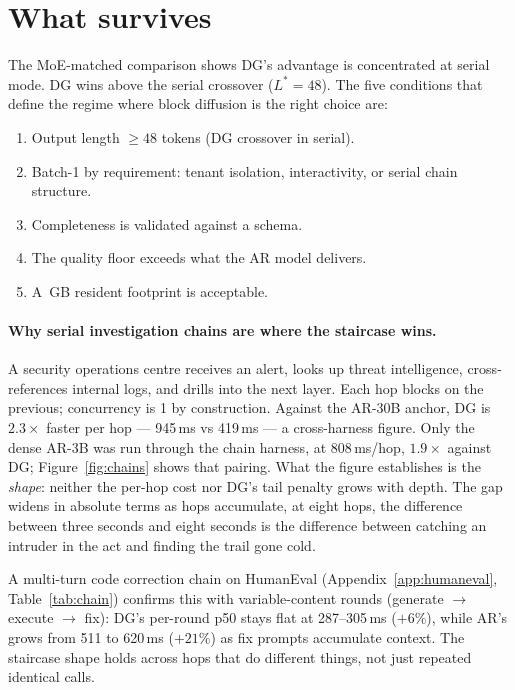 \section{What survives}
\label{sec:survives}

The MoE-matched comparison shows DG's advantage is concentrated at
serial mode. DG wins above the serial crossover ($L^{*}{=}48$). The
five conditions that define the regime where block diffusion is the
right choice are:
\begin{enumerate}[nosep]
  \item Output length $\geq 48$ tokens (DG crossover in serial).
  \item Batch-1 by requirement: tenant isolation, interactivity, or
    serial chain structure.
  \item Completeness is validated against a schema.
  \item The quality floor exceeds what the AR model delivers.
  \item A \dgWeights\,GB resident footprint is acceptable.
\end{enumerate}

\paragraph{Why serial investigation chains are where the staircase wins.}

A security operations centre receives an alert, looks up threat
intelligence, cross-references internal logs, and drills into the next
layer. Each hop blocks on the previous; concurrency is 1 by
construction. Against the AR-30B anchor, DG is $2.3\times$ faster per
hop --- 945\,ms vs 419\,ms --- a cross-harness figure. Only the dense
AR-3B was run through the chain harness, at 808\,ms/hop, $1.9\times$
against DG; Figure~\ref{fig:chains} shows that pairing. What the
figure establishes is the \emph{shape}: neither the per-hop cost nor
DG's tail penalty grows with depth. The gap widens in absolute terms
as hops accumulate, at eight hops, the difference between three
seconds and eight seconds is the difference between catching an
intruder in the act and finding the trail gone cold.

A multi-turn code correction chain on HumanEval
(Appendix~\ref{app:humaneval}, Table~\ref{tab:chain}) confirms this
with variable-content rounds (generate $\to$ execute $\to$ fix):
DG's per-round p50 stays flat at 287--305\,ms ($+6\%$), while AR's
grows from 511 to 620\,ms ($+21\%$) as fix prompts accumulate
context. The staircase shape holds across hops that do different
things, not just repeated identical calls.


